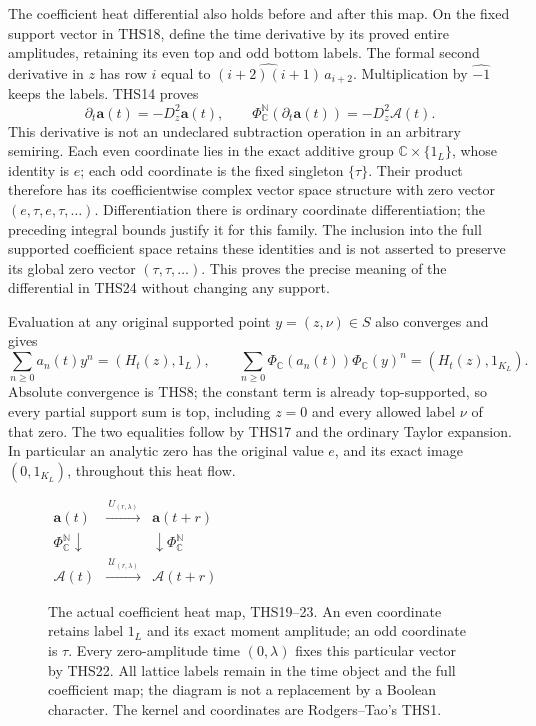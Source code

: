 \documentclass[11pt]{article}
\theoremstyle{definition}
\begin{document}
The coefficient heat differential also holds before and after
this map. On the fixed support vector in THS18, define the time
derivative by its proved entire amplitudes, retaining its even
top and odd bottom labels. The formal second derivative in $z$
has row $i$ equal to $\widehat{(i+2)(i+1)}\,a_{i+2}$.
Multiplication by $\widehat{-1}$ keeps the labels. THS14 proves
\begin{equation}\tag{THS24}
 \partial_t\mathbf a(t)=-D_z^2\mathbf a(t),\qquad
 \Phi_{\mathbb C}^{\mathbb N}(\partial_t\mathbf a(t))
      =-D_z^2\boldsymbol{\mathcal A}(t).
\end{equation}
This derivative is not an undeclared subtraction operation in
an arbitrary semiring. Each even coordinate lies in the exact
additive group $\mathbb C\times\{1_L\}$, whose identity is $e$;
each odd coordinate is the fixed singleton $\{\tau\}$.
Their product therefore has its coefficientwise complex vector
space structure with zero vector $(e,\tau,e,\tau,\ldots)$.
Differentiation there is ordinary coordinate differentiation;
the preceding integral bounds justify it for this family.
The inclusion into the full supported coefficient space retains
these identities and is not asserted to preserve its global
zero vector $(\tau,\tau,\ldots)$. This proves the precise meaning
of the differential in THS24 without changing any support.

Evaluation at any original supported point $y=(z,\nu)\in S$
also converges and gives
\begin{equation}\tag{THS25}
 \sum_{n\ge0}a_n(t)y^n=(H_t(z),1_L),\qquad
 \sum_{n\ge0}\Phi_{\mathbb C}(a_n(t))
                  \Phi_{\mathbb C}(y)^n=(H_t(z),1_{K_L}).
\end{equation}
Absolute convergence is THS8; the constant term is already
top-supported, so every partial support sum is top, including
$z=0$ and every allowed label $\nu$ of that zero. The two
equalities follow by THS17 and the ordinary Taylor expansion.
In particular an analytic zero has the original value $e$,
and its exact image $(0,1_{K_L})$, throughout this heat flow.

\begin{figure}[ht]
\centering
$\begin{array}{ccc}
 \mathbf a(t)&\xrightarrow{\ U_{(r,\lambda)}\ }&\mathbf a(t+r)\\[3pt]
 {\scriptstyle\Phi_{\mathbb C}^{\mathbb N}}\downarrow&&
             \downarrow{\scriptstyle\Phi_{\mathbb C}^{\mathbb N}}\\[3pt]
 \boldsymbol{\mathcal A}(t)&\xrightarrow{\ \mathcal U_{(r,\lambda)}\ }&
                         \boldsymbol{\mathcal A}(t+r)
 \end{array}$
\caption{The actual coefficient heat map, THS19--23. An even
coordinate retains label $1_L$ and its exact moment amplitude;
an odd coordinate is $\tau$. Every zero-amplitude time
$(0,\lambda)$ fixes this particular vector by THS22. All lattice
labels remain in the time object and the full coefficient map;
the diagram is not a replacement by a Boolean character.
The kernel and coordinates are Rodgers--Tao's THS1.}
\end{figure}
\end{document}
